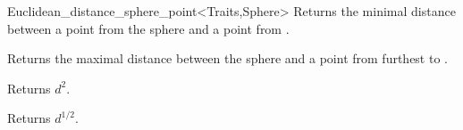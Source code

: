 \begin{ccRefClass}{Euclidean_distance_sphere_point<Traits,Sphere>}
{Returns the minimal distance between a point from the sphere  and a point from
.}

{Returns the maximal distance between the sphere  and
a point from  furthest to . }

 {Returns $d^2$.}

 {Returns $d^{1/2}$.}


\ccSeeAlso




\end{ccRefClass}


